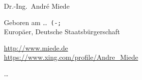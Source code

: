 \documentclass[10pt,a4paper]{scrartcl}
\begin{document}
    \begin{cv}{}
        \begin{cvlist}{}\label{PersDat}  
            \item   Dr.-Ing.~Andr\'e Miede
            \item   Geboren am \dots\ \texttt{(-;} \\	
                    Europ\"aer, Deutsche Staatsb\"urgerschaft 
            \item   \url{http://www.miede.de} \\				
                    \url{https://www.xing.com/profile/Andre_Miede}				
        \end{cvlist}
        
        \begin{cvlist}{}\label{irgendwas}
            \item   \dots 
        \end{cvlist}
    \end{cv}
\end{document}
